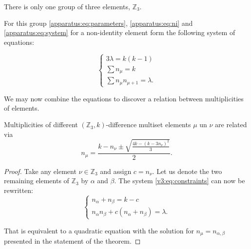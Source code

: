 There is only one group of three elements, $\mathbb Z_3$.

For this group \eqref{apparatus:eq:parameters}, \eqref{apparatus:eq:ni} and \eqref{apparatus:eq:system} for a non-identity element form the following system of equations:

\begin{equation}
	\label{v3:eq:constraints}
	\begin{cases}
		3\lambda = k(k-1) \\
		\sum n_\mu = k \\
		\sum n_\mu n_{\mu+1} = \lambda.
	\end{cases}
\end{equation}

We may now combine the equations to discover a relation between multiplicities of elements.

\begin{theorem}
	\label{v3:theorem:relations}
	Multiplicities of different $(\mathbb Z_3,k)$-difference multiset elements $\mu$ un $\nu$ are related via
	\begin{equation}
		\label{v3:eq:relations}
		n_{\mu} = \frac{k-n_\nu \pm \sqrt{\frac{4k-(k-3n_\nu)^2}{3}}}{2}.
	\end{equation}
\end{theorem}

\begin{proof}
	Take any element $\nu \in \mathbb Z_3$ and assign $c = n_\nu$. Let us denote the two remaining elements of $\mathbb Z_3$ by $\alpha$ and $\beta$. The system \eqref{v3:eq:constraints} can now be rewritten:
	\begin{equation}
		\begin{cases}
			n_\alpha + n_\beta = k - c \\
			n_\alpha n_\beta + c (n_\alpha + n_\beta)  = \lambda.
		\end{cases}
	\end{equation}

That is equivalent to a quadratic equation with the solution for $n_{\mu}=n_{\alpha,\beta}$ presented in the statement of the theorem.

	
	
	
	
\end{proof}

